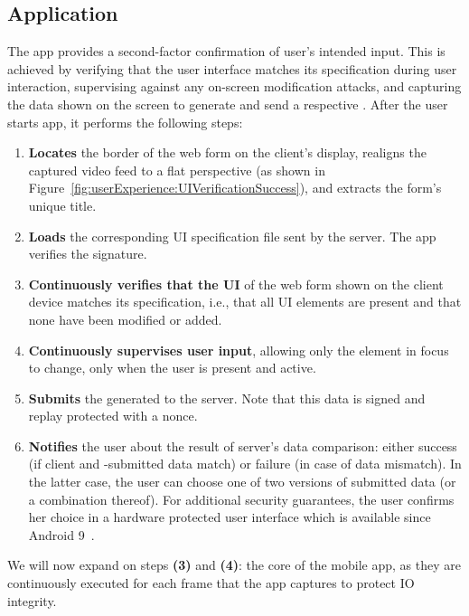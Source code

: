 \subsection{\sysname Application} 
\label{sec:systemDesign:phone}

The app provides a second-factor confirmation of user's intended input. This is achieved by verifying that the user interface matches its specification during user interaction, supervising against any on-screen modification attacks, and capturing the data shown on the screen to generate and send a respective \POI. After the user starts \sysname app, it performs the following steps:

\begin{enumerate}
    \item \textbf{Locates} the border of the web form on the client's display, realigns the captured video feed to a flat perspective (as shown in Figure~\ref{fig:userExperience:UIVerificationSuccess}), and extracts the form's unique title.
    \item \textbf{Loads} the corresponding UI specification file sent by the server. The app verifies the signature.
    \item \textbf{Continuously verifies that the UI} of the web form shown on the client device matches its specification, i.e., that all UI elements are present and that none have been modified or added.
    \item \textbf{Continuously supervises user input}, allowing only the element in focus to change, only when the user is present and active.
	\item \textbf{Submits} the generated \POI to the server. Note that this data is signed and replay protected with a nonce.
    \item \textbf{Notifies} the user about the result of server's data comparison: either success (if client and \md -submitted data match) or failure (in case of data mismatch). In the latter case, the user can choose one of two versions of submitted data (or a combination thereof). For additional security guarantees, the user confirms her choice in a hardware protected user interface which is available since Android 9~\cite{androidConfirmation}.
\end{enumerate}

We will now expand on steps \textbf{(3)} and \textbf{(4)}: the core of the \name mobile app, as they are continuously executed for each frame that the app captures to protect IO integrity.


